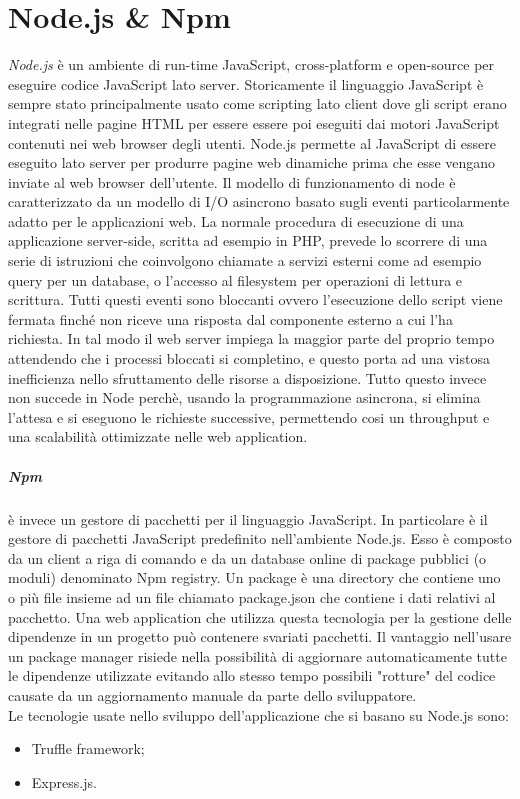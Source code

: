 \section{Node.js \& Npm}%
\emph{Node.js} è un ambiente di run-time JavaScript, cross-platform e open-source per eseguire codice JavaScript lato server. Storicamente il linguaggio JavaScript è sempre stato principalmente usato come scripting lato client dove gli script erano integrati nelle pagine HTML per essere essere poi eseguiti dai motori JavaScript contenuti nei web browser degli utenti. Node.js permette al JavaScript di essere eseguito lato server per produrre pagine web dinamiche prima che esse vengano inviate al web browser dell'utente. Il modello di funzionamento di node è caratterizzato da un modello di I/O asincrono basato sugli eventi particolarmente adatto per le applicazioni web. La normale procedura di esecuzione di una applicazione server-side, scritta ad esempio in PHP, prevede lo scorrere di una serie di istruzioni che coinvolgono chiamate a servizi esterni come ad esempio query per un database, o l'accesso al filesystem per operazioni di lettura e scrittura. Tutti questi eventi sono bloccanti ovvero l'esecuzione dello script viene fermata finché non riceve una risposta dal componente esterno a cui l'ha richiesta. In tal modo il web server impiega la maggior parte del proprio tempo attendendo che i processi bloccati si completino, e questo porta ad una vistosa inefficienza nello sfruttamento delle risorse a disposizione. Tutto questo invece non succede in Node perchè, usando la programmazione asincrona, si elimina l'attesa e si eseguono le richieste successive, permettendo cosi un throughput e una scalabilità ottimizzate nelle web application. 
\subparagraph{Npm} è invece un gestore di pacchetti per il linguaggio JavaScript. In particolare è il gestore di pacchetti JavaScript predefinito nell'ambiente Node.js. Esso è composto da un client a riga di comando e da un database online di package pubblici (o moduli) denominato Npm registry. Un package è una directory che contiene uno o più file insieme ad un file chiamato package.json che contiene i dati relativi al pacchetto. Una web application che utilizza questa tecnologia per la gestione delle dipendenze in un progetto può contenere svariati pacchetti. Il vantaggio nell'usare un package manager risiede nella possibilità di aggiornare automaticamente tutte le dipendenze utilizzate evitando allo stesso tempo possibili "rotture" del codice causate da un aggiornamento manuale da parte dello sviluppatore. \\ 
Le tecnologie usate nello sviluppo dell'applicazione che si basano su Node.js sono:
\begin{itemize}
	\item Truffle framework;
	\item Express.js.
\end{itemize}
%
